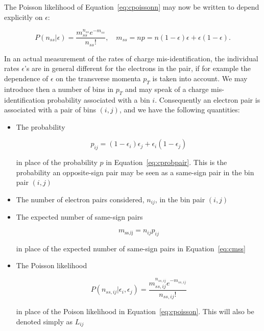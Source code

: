 The Poisson likelihood of Equation~\ref{eq:cpoissonn} may now be written to
depend explicitly on $\epsilon$:

\begin{equation}\label{eq:cpoisson}
	P(n_{ss}|\epsilon) = \frac{m_{ss}^{n_{ss}} e^{-m_{ss}}}{n_{ss}!}, \quad
	m_{ss} = np = n(1-\epsilon)\epsilon +  \epsilon(1-\epsilon).
\end{equation}

In an actual measurement of the rates of charge mis-identification, the
individual rates $\epsilon$'s are in general different for the electrons in the
pair, if for example the dependence of $\epsilon$ on the transverse momenta
$p_T$ is taken into account. We may introduce then a number of bins in $p_T$
and may speak of a charge mis-identification probability associated with a bin
$i$. Consequently an electron pair is associated with a pair of bins $(i,j)$,
and we have the following quantities:

\begin{itemize}[label=]
	\item The probability

	      \begin{equation}\label{eq:cijw}
		      p_{ij} = (1-\epsilon_i)\epsilon_j +  \epsilon_i(1-\epsilon_j)
	      \end{equation}

	      in place of the probability $p$ in Equation~\ref{eq:cprobpair}. This is the
	      probability an opposite-sign pair
	      may be seen as a same-sign pair in the bin pair $(i,j)$

	\item The number of electron pairs considered, $n_{ij}$,  in the bin pair $(i,j)$

	\item The expected number of same-sign pairs

	      \begin{equation}\label{eq:cmssij}
		      m_{\text{ss,ij}} = n_{ij} p_{ij}
	      \end{equation}

	      in place of the expected number of same-sign pairs in Equation~\ref{eq:cmss}


	\item The Poisson likelihood

	      \begin{equation}\label{eq:cpoissonij}
		      P(n_{ss,ij} | \epsilon_i, \epsilon_j) = \frac{m_{ss,ij}^{n_{ss,ij}} e^{-m_{ss,ij}}}{n_{ss,ij}!}
	      \end{equation}

	      in place of the Poison likelihood in Equation~\ref{eq:cpoisson}. This will also
	      be denoted simply as $L_{ij}$

\end{itemize}


